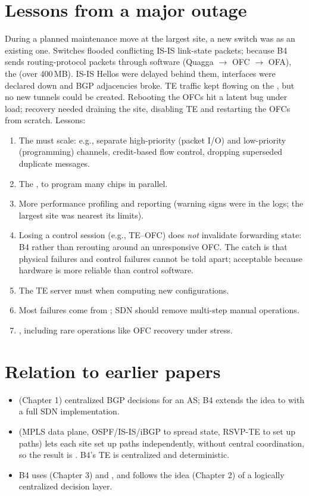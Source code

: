 \section{Lessons from a major outage}
During a planned maintenance move at the largest site, a new switch was  as an existing one. Switches flooded conflicting IS-IS link-state packets; because B4 sends routing-protocol packets through software (Quagga $\to$ OFC $\to$ OFA), the  (over 400\,MB). IS-IS Hellos were delayed behind them, interfaces were declared down and BGP adjacencies broke. TE traffic kept flowing on the , but no new tunnels could be created. Rebooting the OFCs hit a latent bug under load; recovery needed draining the site, disabling TE and restarting the OFCs from scratch. Lessons:
\begin{enumerate}
\item The  must scale: e.g., separate high-priority (packet I/O) and low-priority (programming) channels, credit-based flow control, dropping superseded duplicate messages.
\item The , to program many chips in parallel.
\item More performance profiling and reporting (warning signs were in the logs; the largest site was nearest its limits).
\item Losing a control session (e.g., TE--OFC) does \emph{not} invalidate forwarding state: B4  rather than rerouting around an unresponsive OFC. The catch is that physical failures and control failures cannot be told apart; acceptable because hardware is more reliable than control software.
\item The TE server must  when computing new configurations.
\item Most failures come from ; SDN should remove multi-step manual operations.
\item {}, including rare operations like OFC recovery under stress.
\end{enumerate}

\section{Relation to earlier papers}
\begin{itemize}
\item {} (Chapter 1) centralized BGP decisions for an AS; B4 extends the idea to  with a full SDN implementation.
\item {} (MPLS data plane, OSPF/IS-IS/iBGP to spread state, RSVP-TE to set up paths) lets each site set up paths independently, without central coordination, so the result is . B4's TE is centralized and deterministic.
\item B4 uses  (Chapter 3) and , and follows the  idea (Chapter 2) of a logically centralized decision layer.
\end{itemize}

